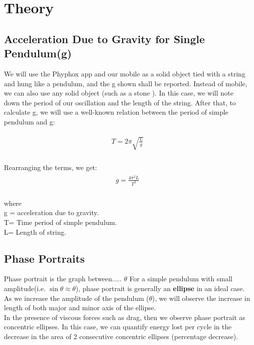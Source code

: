 \documentclass[11pt]{scrartcl} %
\begin{document}

\section{Theory}


\subsection{Acceleration Due to Gravity for Single Pendulum(g)}

We will use the Phyphox app and our mobile as a solid object tied with a string and hung like a pendulum, and the g shown shall be reported. Instead of mobile, we can also use any solid object (such as a stone ). In this case, we will note down the period of our oscillation and the length of the string. After that, to calculate g, we will use a well-known relation between the period of simple pendulum and g: \par

\begin{align} 
	\begin{split}
		T = 2\pi\sqrt{\frac{L}{g}}\\
	\end{split}					
\end{align}

Rearranging the terms, we get:
\begin{align} 
	\begin{split}
		g = \frac{4\pi^2L}{T^2}\\
	\end{split}					
\end{align}

where\\ g = acceleration due to gravity.\\ T= Time period of simple pendulum.\\ L= Length of string. \par


\subsection{Phase Portraits}
Phase portrait is the graph between..... $\theta$ For a simple pendulum with small amplitude(i.e. $\sin\theta \approx \theta$), phase portrait is generally an \textbf{ellipse} in an ideal case. As we increase the amplitude of the pendulum ($\theta$), we will observe the increase in length of both major and minor axis of the ellipse. \\
In the presence of viscous forces such as drag, then we observe phase portrait as concentric ellipses. In this case, we can quantify energy lost per cycle in the decrease in the area of 2 consecutive concentric ellipses (percentage decrease).
\end{document}
